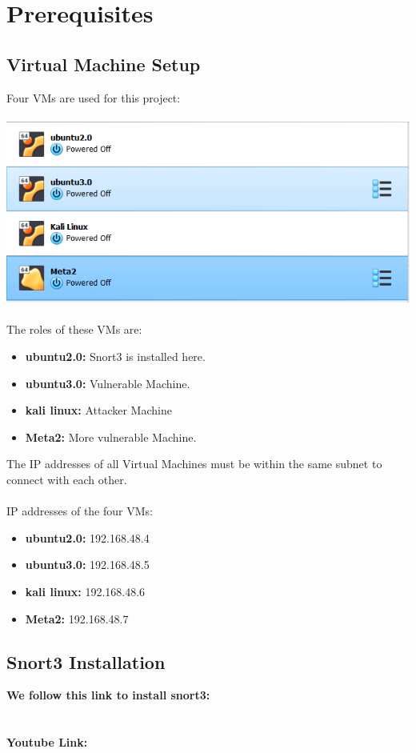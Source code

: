 \documentclass{article}
\begin{document}
\section{Prerequisites}
\label{sec:Task3}
\subsection{Virtual Machine Setup}
Four VMs are used for this project:\\\\
\includegraphics[width=1.0\textwidth]{images/vms_list.PNG}\\\\
The roles of these VMs are:
\begin{itemize}
 \item \textbf{ubuntu2.0:} Snort3 is installed here.
 \item \textbf{ubuntu3.0:} Vulnerable Machine.
 \item \textbf{kali linux:} Attacker Machine
 \item \textbf{Meta2:} More vulnerable Machine.
\end{itemize}
\clearpage
\hspace{-\3.5cm}The IP addresses of all Virtual Machines must be within the same subnet to connect with each other.\\\\
IP addresses of the four VMs:\\
\begin{itemize}
 \item \textbf{ubuntu2.0:} 192.168.48.4
 \item \textbf{ubuntu3.0:} 192.168.48.5
 \item \textbf{kali linux:} 192.168.48.6
 \item \textbf{Meta2:} 192.168.48.7
\end{itemize}
\vspace{3cm}
\subsection{Snort3 Installation}
\textbf{We follow this link to install snort3:}\\
\href{https://cytoolz.com/blog/snort-3-install-and-configure-intrusion-detection-system-on-ubuntu-22-04}\\\\
\textbf{Youtube Link:}\\
\href{https://youtu.be/uPdCmuFh40M?si=gJXhh7eJ9ibMkw4R}
\clearpage
\end{document}
